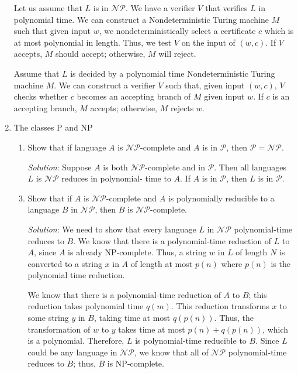 \documentclass[]{article}
\begin{document}
\begin{enumerate}
Let us assume that $L$ is in $\mathcal{NP}$. We have a verifier $V$ that
verifies $L$ in polynomial time. We can construct a Nondeterministic Turing
machine $M$ such that given input $w$, we nondeterministically select a
certificate $c$ which is at most polynomial in length. Thus, we test $V$ on the
input of $(w, c)$. If $V$ accepts, $M$ should accept; otherwise, $M$ will
reject.

Assume that $L$ is decided by a polynomial time Nondeterministic Turing machine
$M$. We can construct a verifier $V$ such that, given input $(w, c)$, $V$ checks
whether $c$ becomes an accepting branch of $M$ given input $w$. If $c$ is an
accepting branch, $M$ accepts; otherwise, $M$ rejects $w$.

\item The classes P and NP
\begin{enumerate}
\item Show that if language $A$ is $\mathcal{NP}$-complete and $A$ is in
$\mathcal{P}$, then $\mathcal{P=NP}$.
\item[\emph{Solution}:] Suppose $A$ is both $\mathcal{NP}$-complete and in
$\mathcal{P}$. Then all languages $L$ is $\mathcal{NP}$ reduces in polynomial-
time to $A$. If $A$ is in $\mathcal{P}$, then $L$ is in $\mathcal{P}$.

\item Show that if $A$ is $\mathcal{NP}$-complete and $A$ is polynomially
reducible to a language $B$ in $\mathcal{NP}$, then $B$ is
$\mathcal{NP}$-complete.
\item[\emph{Solution}:] We need to show that every language $L$ in
$\mathcal{NP}$ polynomial-time reduces to $B$. We know that there is a
polynomial-time reduction of $L$ to $A$, since $A$ is already NP-complete. Thus,
a string $w$ in $L$ of length $N$ is converted to a string $x$ in $A$ of length
at most $p(n)$ where $p(n)$ is the polynomial time reduction.

We know that there is a polynomial-time reduction of $A$ to $B$; this reduction
takes polynomial time $q(m)$. This reduction transforms $x$ to some string $y$
in $B$, taking time at most $q(p(n))$. Thus, the transformation of $w$ to $y$
takes time at most $p(n) + q(p(n))$, which is a polynomial. Therefore, $L$ is
polynomial-time reducible to $B$. Since $L$ could be any language in
$\mathcal{NP}$, we know that all of $\mathcal{NP}$ polynomial-time reduces to
$B$; thus, $B$ is NP-complete.

\end{enumerate}
\end{enumerate}
\end{document}
